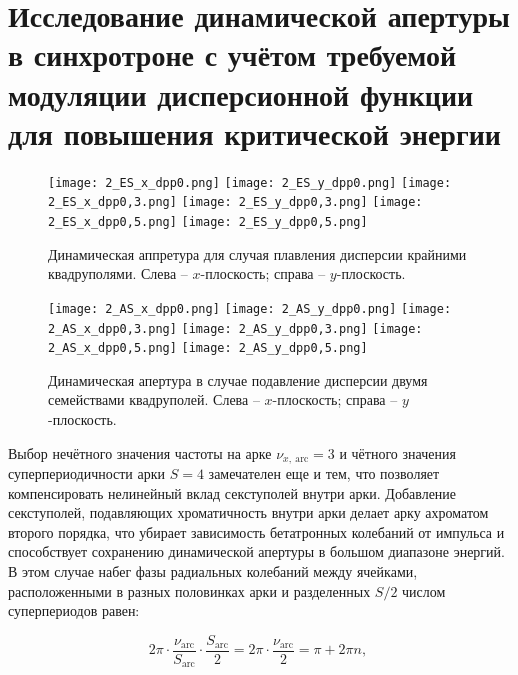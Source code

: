 \section{Исследование динамической апертуры в синхротроне с учётом требуемой модуляции дисперсионной функции для повышения критической энергии}

\begin{figure} [h!]
	\center
	\texttt{[image: 2\_ES\_x\_dpp0.png]}
	\texttt{[image: 2\_ES\_y\_dpp0.png]}
	\texttt{[image: 2\_ES\_x\_dpp0,3.png]}
	\texttt{[image: 2\_ES\_y\_dpp0,3.png]}
	\texttt{[image: 2\_ES\_x\_dpp0,5.png]}
	\texttt{[image: 2\_ES\_y\_dpp0,5.png]}
	\caption{Динамическая аппретура для случая плавления дисперсии крайними квадруполями. 
		Слева – $x$-плоскость; справа – $y$-плоскость.}
	\label{fig:DA_ES_dpp}
\end{figure}	

\begin{figure} [h!]
   \center
   \texttt{[image: 2\_AS\_x\_dpp0.png]}
   \texttt{[image: 2\_AS\_y\_dpp0.png]}
   \texttt{[image: 2\_AS\_x\_dpp0,3.png]}
   \texttt{[image: 2\_AS\_y\_dpp0,3.png]}
   \texttt{[image: 2\_AS\_x\_dpp0,5.png]}
   \texttt{[image: 2\_AS\_y\_dpp0,5.png]}
   \caption{Динамическая апертура в случае подавление дисперсии двумя семействами квадруполей.
Слева – $x$-плоскость; справа – $y$-плоскость.}
   \label{fig:DA_AS_dpp}
\end{figure}

\par Выбор нечётного значения частоты на арке $\nu_{x,\ \text{arc}}=3$ и чётного значения суперпериодичности арки $S=4$ замечателен еще и тем, что позволяет компенсировать нелинейный вклад секступолей внутри арки. Добавление секступолей, подавляющих хроматичность внутри арки делает арку ахроматом второго порядка, что убирает зависимость бетатронных колебаний от импульса и способствует сохранению динамической апертуры в большом диапазоне энергий. В этом случае набег фазы радиальных колебаний между ячейками, расположенными в разных половинках арки и разделенных $S/2$ числом суперпериодов равен:

\begin{equation}
2\pi\cdot\frac{\nu_{\text{arc}}}{S_{\text{arc}}}\cdot\frac{S_{\text{arc}}}{2}=2\pi\cdot\frac{\nu_{\text{arc}}}{2}=\pi+2\pi n,\
\label{eq:chrom_period}
\end{equation}

